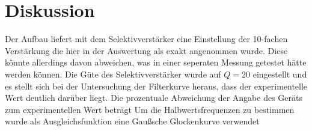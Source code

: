 \section{Diskussion}

Der Aufbau liefert mit dem Selektivverstärker eine Einstellung der 10-fachen Verstärkung die hier in der Auswertung als
exakt angenommen wurde. Diese könnte allerdings davon abweichen, was in einer seperaten Messung getestet hätte werden können. Die Güte des Selektivverstärker wurde auf $Q = 20$ eingestellt und es stellt sich
bei der Untersuchung der Filterkurve heraus, dass der experimentelle Wert deutlich darüber liegt. Die prozentuale Abweichung der Angabe des Geräts zum experimentellen Wert beträgt
%
Um die Halbwertsfrequenzen zu bestimmen wurde als Ausgleichsfunktion eine Gaußsche Glockenkurve verwendet 